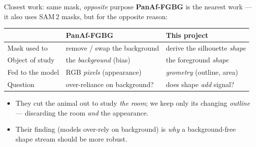 \documentclass[aspectratio=169,11pt]{beamer}
\begin{document}
\begin{frame}{Closest work: same mask, \emph{opposite} purpose}
  \textbf{PanAf-FGBG} is the nearest work --- it also uses SAM\,2 masks, but for the
  opposite reason:
  \vfill
  \begin{center}\footnotesize
  \begin{tabular}{@{}lll@{}}
    \toprule
     & \textbf{PanAf-FGBG} & \textbf{This project} \\
    \midrule
    Mask used to     & remove / swap the background  & derive the silhouette \emph{shape} \\
    Object of study  & the \emph{background} (bias)   & the foreground \emph{shape} \\
    Fed to the model & RGB \emph{pixels} (appearance) & \emph{geometry} (outline, area) \\
    Question         & over-reliance on background?  & does shape \emph{add} signal? \\
    \bottomrule
  \end{tabular}
  \end{center}
  \vfill
  \begin{itemize}
    \item They cut the animal out to study \emph{the room}; we keep only its changing
          \emph{outline} --- discarding the room \emph{and} the appearance.
    \item Their finding (models over-rely on background) is \emph{why} a background-free
          shape stream should be more robust.
  \end{itemize}
\end{frame}
\end{document}
